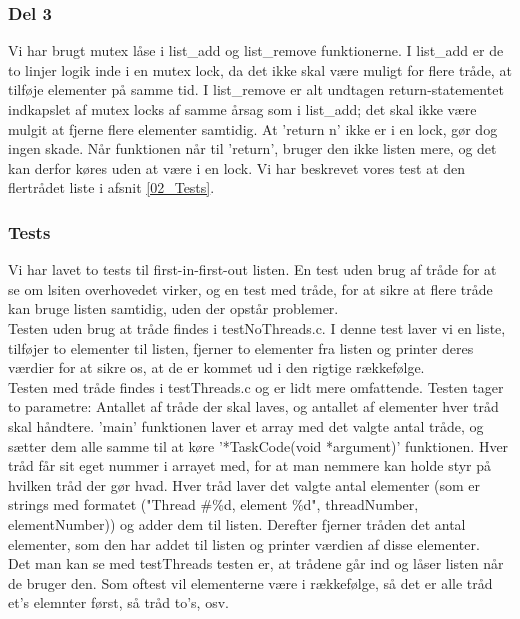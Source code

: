 {\subsubsection{Del 3}
\label{O2_3}
Vi har brugt mutex låse i list_add og list_remove funktionerne. I list_add er de to linjer logik inde i en mutex lock, da det ikke skal være muligt for flere tråde, at tilføje elementer på samme tid. I list_remove er alt undtagen return-statementet indkapslet af mutex locks af samme årsag som i list_add; det skal ikke være mulgit at fjerne flere elementer samtidig. At 'return n' ikke er i en lock, gør dog ingen skade. Når funktionen når til 'return', bruger den ikke listen mere, og det kan derfor køres uden at være i en lock.
Vi har beskrevet vores test at den flertrådet liste i afsnit \ref{02_Tests}.

\subsubsection{Tests}
\label{O2_Tests}
Vi har lavet to tests til first-in-first-out listen. En test uden brug af tråde for at se om lsiten overhovedet virker, og en test med tråde, for at sikre at flere tråde kan bruge listen samtidig, uden der opstår problemer.
\\Testen uden brug at tråde findes i testNoThreads.c. I denne test laver vi en liste, tilføjer to elementer til listen, fjerner to elementer fra listen og printer deres værdier for at sikre os, at de er kommet ud i den rigtige rækkefølge. 
\\Testen med tråde findes i testThreads.c og er lidt mere omfattende. Testen tager to parametre: Antallet af tråde der skal laves, og antallet af elementer hver tråd skal håndtere. 'main' funktionen laver et array med det valgte antal tråde, og sætter dem alle samme til at køre '*TaskCode(void *argument)' funktionen. Hver tråd får sit eget nummer i arrayet med, for at man nemmere kan holde styr på hvilken tråd der gør hvad. Hver tråd laver det valgte antal elementer (som er strings med formatet ("Thread \#\%d, element \%d", threadNumber, elementNumber)) og adder dem til listen. Derefter fjerner tråden det antal elementer, som den har addet til listen og printer værdien af disse elementer. 
\\Det man kan se med testThreads testen er, at trådene går ind og låser listen når de bruger den. Som oftest vil elementerne være i rækkefølge, så det er alle tråd et's elemnter først, så tråd to's, osv.

}
